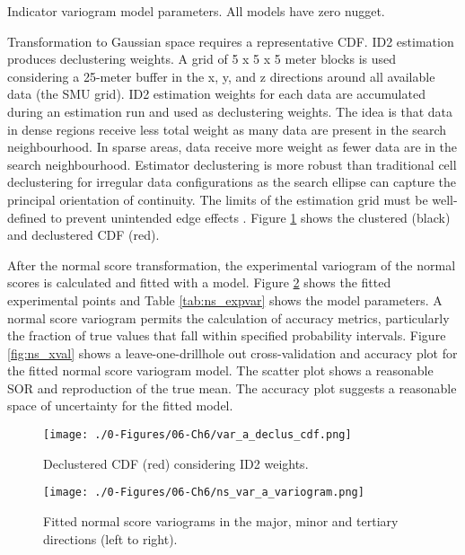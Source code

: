 \begin{table}[!htb]
    \centering
    \caption{Indicator variogram model parameters. All models have zero nugget.}
    \resizebox{0.9\width}{!}{}
    \label{tab:ind_expvar}
\end{table}

Transformation to Gaussian space requires a representative \gls{CDF}.  \Gls{ID2} estimation produces declustering weights. A grid of 5 x 5 x 5 meter blocks is used considering a 25-meter buffer in the x, y, and z directions around all available data (the \gls{SMU} grid). \Gls{ID2} estimation weights for each data are accumulated during an estimation run and used as declustering weights. The idea is that data in dense regions receive less total weight as many data are present in the search neighbourhood. In sparse areas, data receive more weight as fewer data are in the search neighbourhood. Estimator declustering is more robust than traditional cell declustering for irregular data configurations as the search ellipse can capture the principal orientation of continuity. The limits of the estimation grid must be well-defined to prevent unintended edge effects \citep{Wilde2007}. Figure \ref{fig:declus_cdf} shows the clustered (black) and declustered \gls{CDF} (red).

After the normal score transformation, the experimental variogram of the normal scores is calculated and fitted with a model. Figure \ref{fig:ns_expvar} shows the fitted experimental points and Table \ref{tab:ns_expvar} shows the model parameters. A normal score variogram permits the calculation of accuracy metrics, particularly the fraction of true values that fall within specified probability intervals. Figure \ref{fig:ns_xval} shows a leave-one-drillhole out cross-validation and accuracy plot for the fitted normal score variogram model. The scatter plot shows a reasonable \gls{SOR} and reproduction of the true mean. The accuracy plot suggests a reasonable space of uncertainty for the fitted model.

\begin{figure}[htb!]
    \centering
    \texttt{[image: ./0-Figures/06-Ch6/var\_a\_declus\_cdf.png]}
    \caption{ Declustered \gls{CDF} (red) considering \gls{ID2} weights. }
    \label{fig:declus_cdf}
\end{figure}

\begin{figure}[htb!]
    \centering
    \texttt{[image: ./0-Figures/06-Ch6/ns\_var\_a\_variogram.png]}
    \caption{Fitted normal score variograms in the major, minor and tertiary directions (left to right). }
    \label{fig:ns_expvar}
\end{figure}

